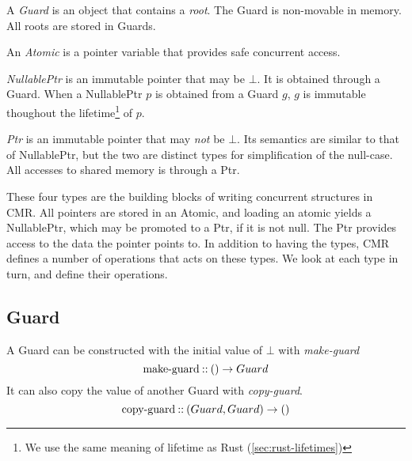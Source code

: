 \begin{definition}
  A \emph{Guard} is an object that contains a \emph{root}. The Guard is non-movable in memory.
  All roots are stored in Guards.
\end{definition}

\begin{definition}[Atomic]
  An \emph{Atomic} is a pointer variable that provides safe concurrent access.
\end{definition}

\begin{definition}[NullablePtr]
  \emph{NullablePtr} is an immutable pointer that may be $\bot$. It is obtained through a Guard.
  When a NullablePtr $p$ is obtained from a Guard $g$, $g$ is immutable thoughout the
  lifetime\footnote{We use the same meaning of lifetime as Rust (\cref{sec:rust-lifetimes})}
  of $p$.
\end{definition}

\begin{definition}[Ptr]
  \emph{Ptr} is an immutable pointer that may \emph{not} be $\bot$. Its semantics are similar to
  that of NullablePtr, but the two are distinct types for simplification of the null-case. All
  accesses to shared memory is through a Ptr.
\end{definition}

These four types are the building blocks of writing concurrent structures in CMR\@. All pointers
are stored in an Atomic, and loading an atomic yields a NullablePtr, which may be promoted to a
Ptr, if it is not null. The Ptr provides access to the data the pointer points to.
In addition to having the types, CMR defines a number of operations that acts on these types.
We look at each type in turn, and define their operations.

\subsection{Guard}
A Guard can be constructed with the initial value of $\bot$ with \emph{make-guard}
\begin{equation}\label{eq:make-guard}
  \text{make-guard\:::\:} () \to Guard
\end{equation}
It can also copy the value of another Guard with \emph{copy-guard}.
\begin{equation}\label{eq:copy-guard}
  \text{copy-guard\:::\:} (Guard, Guard) \to ()
\end{equation}


